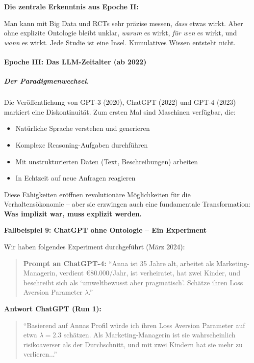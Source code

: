 \textbf{Die zentrale Erkenntnis aus Epoche II:}

Man kann mit Big Data und RCTs sehr präzise messen, \textit{dass} etwas wirkt. Aber ohne explizite Ontologie bleibt unklar, \textit{warum} es wirkt, \textit{für wen} es wirkt, und \textit{wann} es wirkt. Jede Studie ist eine Insel. Kumulatives Wissen entsteht nicht.

\paragraph{Epoche III: Das LLM-Zeitalter (ab 2022)}

\subparagraph{Der Paradigmenwechsel.}

Die Veröffentlichung von GPT-3 (2020), ChatGPT (2022) und GPT-4 (2023) markiert eine Diskontinuität. Zum ersten Mal sind Maschinen verfügbar, die:
\begin{itemize}
    \item Natürliche Sprache verstehen und generieren
    \item Komplexe Reasoning-Aufgaben durchführen
    \item Mit unstrukturierten Daten (Text, Beschreibungen) arbeiten
    \item In Echtzeit auf neue Anfragen reagieren
\end{itemize}

Diese Fähigkeiten eröffnen revolutionäre Möglichkeiten für die Verhaltensökonomie -- aber sie erzwingen auch eine fundamentale Transformation: \textbf{Was implizit war, muss explizit werden.}

\textbf{Fallbeispiel 9: ChatGPT ohne Ontologie -- Ein Experiment}

Wir haben folgendes Experiment durchgeführt (März 2024):

\begin{quote}
\textbf{Prompt an ChatGPT-4:} ``Anna ist 35 Jahre alt, arbeitet als Marketing-Managerin, verdient €80.000/Jahr, ist verheiratet, hat zwei Kinder, und beschreibt sich als `umweltbewusst aber pragmatisch'. Schätze ihren Loss Aversion Parameter $\lambda$.''
\end{quote}

\textbf{Antwort ChatGPT (Run 1):}
\begin{quote}
``Basierend auf Annas Profil würde ich ihren Loss Aversion Parameter auf etwa $\lambda = 2.3$ schätzen. Als Marketing-Managerin ist sie wahrscheinlich risikoaverser als der Durchschnitt, und mit zwei Kindern hat sie mehr zu verlieren...''
\end{quote}

